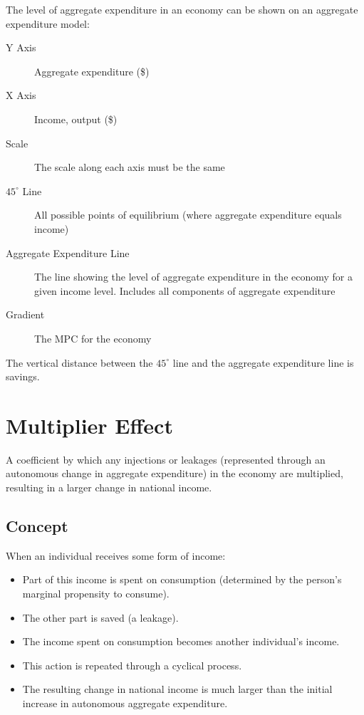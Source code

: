 \documentclass[a4paper,11pt]{article}
\begin{document}

The level of aggregate expenditure in an economy can be shown on an aggregate
expenditure model:

\begin{description}
\item [Y Axis] Aggregate expenditure (\$)
\item [X Axis] Income, output (\$)
\item [Scale] The scale along each axis must be the same
\item [$45^\circ$ Line] All possible points of equilibrium (where aggregate
	expenditure equals income)
\item [Aggregate Expenditure Line] The line showing the level of aggregate
	expenditure in the economy for a given income level. Includes all components
	of aggregate expenditure
\item [Gradient] The MPC for the economy
\end{description}

The vertical distance between the $45^\circ$ line and the aggregate expenditure
line is savings.




\section{Multiplier Effect}

A coefficient by which any injections or leakages (represented through an
autonomous change in aggregate expenditure) in the economy are multiplied,
resulting in a larger change in national income.


\subsection{Concept}

When an individual receives some form of income:

\begin{itemize}
\item Part of this income is spent on consumption (determined by the person's
	marginal propensity to consume).
\item The other part is saved (a leakage).
\item The income spent on consumption becomes another individual's income.
\item This action is repeated through a cyclical process.
\item The resulting change in national income is much larger than the initial
	increase in autonomous aggregate expenditure.
\end{itemize}
\end{document}
